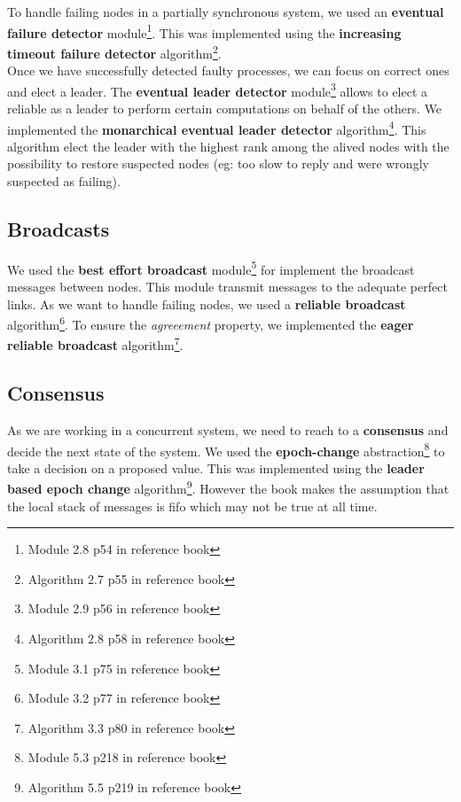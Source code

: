 \documentclass[11pt,english,a4paper]{article}
\begin{document}
To handle failing nodes in a partially synchronous system, we used an \textbf{eventual failure detector} module\footnote{Module 2.8 p54 in reference book}.
This was implemented using the \textbf{increasing timeout failure detector} algorithm\footnote{Algorithm 2.7 p55 in reference book}.\\

Once we have successfully detected faulty processes, we can focus on correct ones and elect a leader.
The \textbf{eventual leader detector} module\footnote{Module 2.9 p56 in reference book} allows to elect a reliable as a leader to perform certain computations on behalf of the others.
We implemented the \textbf{monarchical eventual leader detector} algorithm\footnote{Algorithm 2.8 p58 in reference book}.
This algorithm elect the leader with the highest rank among the alived nodes with the possibility to restore suspected nodes (eg: too slow to reply and were wrongly suspected as failing).


\subsection*{Broadcasts}
We used the \textbf{best effort broadcast} module\footnote{Module 3.1 p75 in reference book} for implement the broadcast messages between nodes.
This module transmit messages to the adequate perfect links.
As we want to handle failing nodes, we used a \textbf{reliable broadcast} algorithm\footnote{Module 3.2 p77 in reference book}.
To ensure the \emph{agreeement} property, we implemented the \textbf{eager reliable broadcast} algorithm\footnote{Algorithm 3.3 p80 in reference book}.


\subsection*{Consensus}
As we are working in a concurrent system, we need to reach to a \textbf{consensus} and decide the next state of the system.
We used the \textbf{epoch-change} abstraction\footnote{Module 5.3 p218 in reference book} to take a decision on a proposed value.
This was implemented using the \textbf{leader based epoch change} algorithm\footnote{Algorithm 5.5 p219 in reference book}.
However the book makes the assumption that the local stack of messages is fifo which may not be true at all time. \\ %
\end{document}
